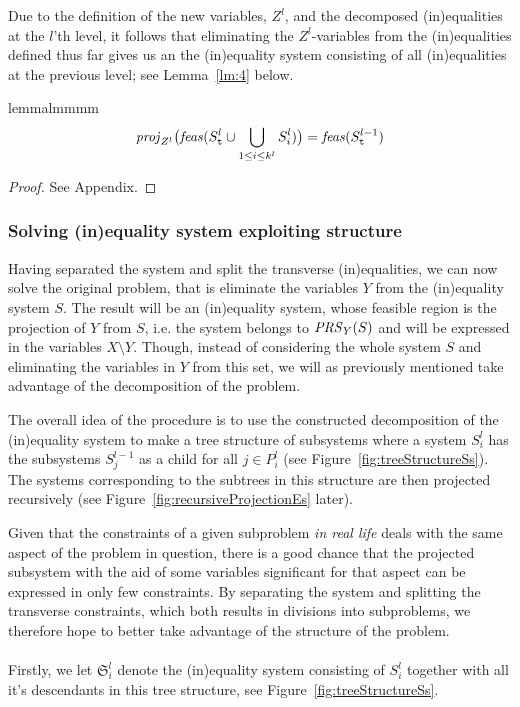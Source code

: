 Due to the definition of the new variables, $Z^l$, and the decomposed (in)equalities at the $l$'th level, it follows that eliminating the $Z^l$-variables from 
the (in)equalities defined thus far gives us an the (in)equality system consisting of all (in)equalities at the previous level; see Lemma~\ref{lm:4} below.

\begin{restatable}{lemma}{lmmmm}\label{lm:4}
\[
\mathit{proj}_{Z^l}\big(\mathit{feas}(S^l_{\texttt{t}}\cup\bigcup_{1\leq i\leq k^l}S^l_i)\big) = \mathit{feas}(S^{l-1}_{\texttt{t}})
\]
\end{restatable}
\begin{proof}
See Appendix.
\end{proof}
%
%
\subsubsection*{Solving (in)equality system exploiting structure}
Having separated the system and split the transverse (in)equalities, we can now solve the original problem, that is eliminate the variables $Y$ from the (in)equality system $S$. The result will be an (in)equality system, whose feasible region is the projection of $Y$ from $S$, i.e. the system belongs to $\mathit{PRS}_Y(S)$ and will be expressed in the variables $X\setminus Y$. Though, instead of considering the whole system $S$ and eliminating the variables in $Y$ from this set, we will as previously mentioned take advantage of the decomposition of the problem. 

The overall idea of the procedure is to use the constructed decomposition of the (in)equality system to make a tree structure of subsystems where a system $S^l_i$ has the subsystems $S^{l-1}_{j}$ as a child for all $j\in P^l_i$ (see Figure~\ref{fig:treeStructureSs}). The systems corresponding to the subtrees in this structure are then projected recursively (see Figure~\ref{fig:recursiveProjectionEs} later).

{Given that the constraints of a given subproblem \emph{in real life} deals with the same aspect of the problem in question, there is a good chance that the projected subsystem with the aid of some variables significant for that aspect can be expressed in only few constraints. By separating the system and splitting the transverse constraints, which both results in divisions into subproblems, we therefore hope to better take advantage of the structure of the problem.}
\\\\
Firstly, we let $\mathfrak{S}^l_i$ denote the (in)equality system consisting of $S^l_i$ together with all it's descendants in this tree structure, see Figure~\ref{fig:treeStructureSs}. 

